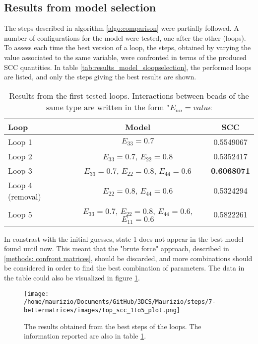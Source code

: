 \subsection{Results from model selection} \label{chap:results_model_selection}

The steps described in algorithm \ref{algo:comparison} were partially followed. A number of configurations for the model were tested, one after the other (loops). To assess each time the best version of a loop, the steps, obtained by varying the value associated to the same variable, were confronted in terms of the produced SCC quantities. In table \ref{tab:results_model_sloopselection}, the performed loops are listed, and only the steps giving the best results are shown. 

\begin{table}[H]
    \centering
    \begin{tabular}{|l|c|c|}
        \hline
        \textbf{Loop} & \textbf{Model} & \textbf{SCC} \\
        \hline
        Loop 1 & $E_{33} = 0.7$ & 0.5549067 \\
        \hline
        Loop 2 & $E_{33} = 0.7$, $E_{22} = 0.8$ & 0.5352417 \\
        \hline
        Loop 3 & $E_{33} = 0.7$, $E_{22} = 0.8$, $E_{44} = 0.6$ & \textbf{0.6068071} \\
        \hline      
        Loop 4 (removal) & $E_{22} = 0.8$, $E_{44} = 0.6$ & 0.5324294 \\
        \hline
        Loop 5 & $E_{33} = 0.7$, $E_{22} = 0.8$, $E_{44} = 0.6$, $E_{11} = 0.6$ & 0.5822261 \\
        \hline    
    \end{tabular}
    \caption{Results from the first tested loops. Interactions between beads of the same type are written in the form "$E_{nn} = value$}
    \label{tab:results_model_selection}
\end{table}

In constrast with the initial guesses, state 1 does not appear in the best model found until now. This meant that the "brute force" approach, described in \ref{methods: confront matrices}, should be discarded, and more combinations should be considered in order to find the best combination of parameters. The data in the table could also be visualized in figure \ref{fig: loop results}.

\begin{figure}
    \texttt{[image: /home/maurizio/Documents/GitHub/3DCS/Maurizio/steps/7-bettermatrices/images/top\_scc\_1to5\_plot.png]}
    \caption{The results obtained from the best steps of the loops. The information reported are also in table \ref{tab:results_model_selection}.}
    \label{fig: loop results}
\end{figure}

